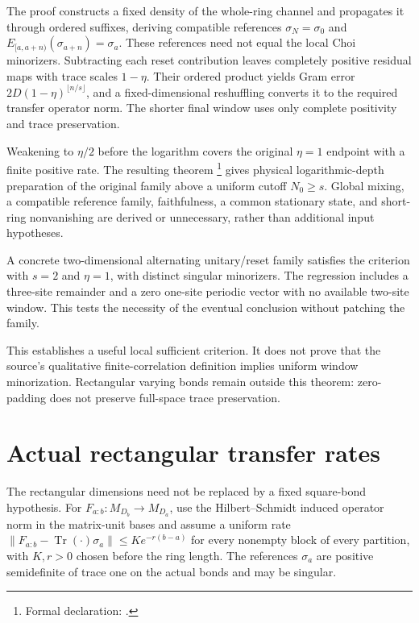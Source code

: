 \documentclass{article}
\begin{document}
The proof constructs a fixed density of the whole-ring channel and
propagates it through ordered suffixes, deriving compatible references
$\sigma_N=\sigma_0$ and
$E_{[a,a+n)}(\sigma_{a+n})=\sigma_a$. These references need not equal
the local Choi minorizers. Subtracting each reset contribution leaves
completely positive residual maps with trace scales $1-\eta$.
Their ordered product yields Gram error
$2D(1-\eta)^{\lfloor n/s\rfloor}$, and a fixed-dimensional reshuffling
converts it to the required transfer operator norm. The shorter final
window uses only complete positivity and trace preservation.

Weakening to $\eta/2$ before the logarithm covers the original
$\eta=1$ endpoint with a finite positive rate. The resulting theorem
\footnote{Formal declaration:
    .}
gives physical logarithmic-depth preparation of the original family above
a uniform cutoff $N_0\ge s$. Global mixing, a compatible reference family,
faithfulness, a common stationary state, and short-ring nonvanishing
are derived or unnecessary, rather than additional input hypotheses.

A concrete two-dimensional alternating unitary/reset family satisfies the
criterion with $s=2$ and $\eta=1$, with distinct singular minorizers.
The regression includes a three-site remainder and a zero one-site
periodic vector with no available two-site window. This tests the
necessity of the eventual conclusion without patching the family.

This establishes a useful local sufficient criterion. It does not prove
that the source's qualitative finite-correlation definition implies
uniform window minorization. Rectangular varying bonds remain outside
this theorem: zero-padding does not preserve full-space trace preservation.

\section{Actual rectangular transfer rates}
The rectangular dimensions need not be replaced by a fixed square-bond
hypothesis. For $F_{a:b}:M_{D_b}\to M_{D_a}$, use the Hilbert--Schmidt
induced operator norm in the matrix-unit bases and assume a uniform rate
$\|F_{a:b}-\operatorname{Tr}(\cdot)\sigma_a\|\le Ke^{-r(b-a)}$
for every nonempty block of every partition, with $K,r>0$ chosen before
the ring length. The references $\sigma_a$ are positive semidefinite of
trace one on the actual bonds and may be singular.
\end{document}
